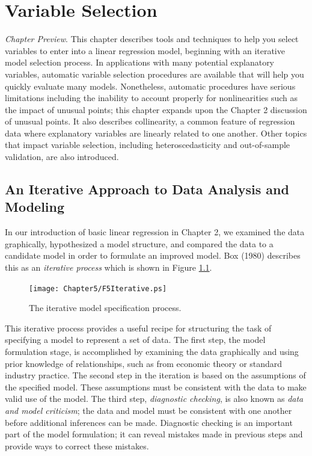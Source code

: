 \setcounter{chapter}{4}

\chapter{Variable Selection}

{\small \textit{Chapter Preview}. This chapter describes tools and
techniques to help you select variables to enter into a linear
regression model, beginning with an iterative model selection
process. In applications with many potential explanatory variables,
automatic variable selection procedures are available that will help
you quickly evaluate many models. Nonetheless, automatic procedures
have serious limitations including the inability to account properly
for nonlinearities such as the impact of unusual points; this
chapter expands upon the Chapter 2 discussion of unusual points. It
also describes collinearity, a common feature of regression data
where explanatory variables are linearly related to one another.
Other topics that impact variable selection, including
heteroscedasticity and out-of-sample validation, are also
introduced.}

\section{An Iterative Approach to Data Analysis and
Modeling}\label{S5:Iterative}

In our introduction of basic linear regression in Chapter 2, we
examined the data graphically, hypothesized a model structure, and
compared the data to a candidate model in order to formulate an
improved model. Box (1980) describes this as an \emph{iterative
process} which is shown in Figure \ref{F5:Iterative}.


\begin{figure}[htp]
    \texttt{[image: Chapter5/F5Iterative.ps]}
   \caption{\label{F5:Iterative} \small The iterative model specification process.}
\end{figure}



This iterative process provides a useful recipe for structuring the
task of specifying a model to represent a set of data. The first
step, the model formulation stage, is accomplished by examining the
data graphically and using prior knowledge of relationships, such as
from economic theory or standard industry practice. The second step
in the iteration is based on the assumptions of the specified model.
These assumptions must be consistent with the data to make valid use
of the model. The third step, \emph{diagnostic checking}, is also
known as \emph{data and model criticism}; the data and model must be
consistent with one another before additional inferences can be
made. Diagnostic checking is an important part of the model
formulation; it can reveal mistakes made in previous steps and
provide ways to correct these mistakes.


